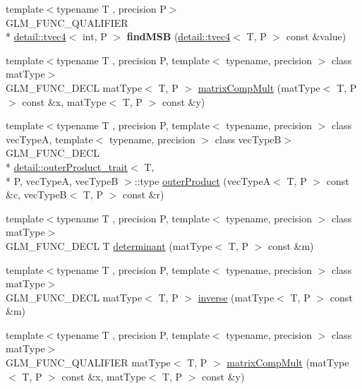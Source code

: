 \begin{DoxyCompactItemize}
\item 
\hypertarget{namespaceglm_a91e6dfc9a29f78870ea1e8918dd90072}{{\footnotesize template$<$typename T , precision P$>$ }\\G\-L\-M\-\_\-\-F\-U\-N\-C\-\_\-\-Q\-U\-A\-L\-I\-F\-I\-E\-R \\*
\hyperlink{structglm_1_1detail_1_1tvec4}{detail\-::tvec4}$<$ int, P $>$ {\bfseries find\-M\-S\-B} (\hyperlink{structglm_1_1detail_1_1tvec4}{detail\-::tvec4}$<$ T, P $>$ const \&value)}\label{namespaceglm_a91e6dfc9a29f78870ea1e8918dd90072}

\item 
{\footnotesize template$<$typename T , precision P, template$<$ typename, precision $>$ class mat\-Type$>$ }\\G\-L\-M\-\_\-\-F\-U\-N\-C\-\_\-\-D\-E\-C\-L mat\-Type$<$ T, P $>$ \hyperlink{group__core__func__matrix_ga4a54992e4741188ee624b21e3ba91814}{matrix\-Comp\-Mult} (mat\-Type$<$ T, P $>$ const \&x, mat\-Type$<$ T, P $>$ const \&y)
\item 
{\footnotesize template$<$typename T , precision P, template$<$ typename, precision $>$ class vec\-Type\-A, template$<$ typename, precision $>$ class vec\-Type\-B$>$ }\\G\-L\-M\-\_\-\-F\-U\-N\-C\-\_\-\-D\-E\-C\-L \\*
\hyperlink{structglm_1_1detail_1_1outer_product__trait}{detail\-::outer\-Product\-\_\-trait}$<$ T, \\*
P, vec\-Type\-A, vec\-Type\-B $>$\-::type \hyperlink{group__core__func__matrix_gae9f513dc8e4f3ceb993669321b6d0f09}{outer\-Product} (vec\-Type\-A$<$ T, P $>$ const \&c, vec\-Type\-B$<$ T, P $>$ const \&r)
\item 
{\footnotesize template$<$typename T , precision P, template$<$ typename, precision $>$ class mat\-Type$>$ }\\G\-L\-M\-\_\-\-F\-U\-N\-C\-\_\-\-D\-E\-C\-L T \hyperlink{group__core__func__matrix_ga26ea77c574802bc6fc193c40478718d2}{determinant} (mat\-Type$<$ T, P $>$ const \&m)
\item 
{\footnotesize template$<$typename T , precision P, template$<$ typename, precision $>$ class mat\-Type$>$ }\\G\-L\-M\-\_\-\-F\-U\-N\-C\-\_\-\-D\-E\-C\-L mat\-Type$<$ T, P $>$ \hyperlink{group__core__func__matrix_ga7635d3dbe5aa10ff73a0e6903bf6bea5}{inverse} (mat\-Type$<$ T, P $>$ const \&m)
\item 
{\footnotesize template$<$typename T , precision P, template$<$ typename, precision $>$ class mat\-Type$>$ }\\G\-L\-M\-\_\-\-F\-U\-N\-C\-\_\-\-Q\-U\-A\-L\-I\-F\-I\-E\-R mat\-Type$<$ T, P $>$ \hyperlink{group__core__func__matrix_ga4a54992e4741188ee624b21e3ba91814}{matrix\-Comp\-Mult} (mat\-Type$<$ T, P $>$ const \&x, mat\-Type$<$ T, P $>$ const \&y)

\end{DoxyCompactItemize}

